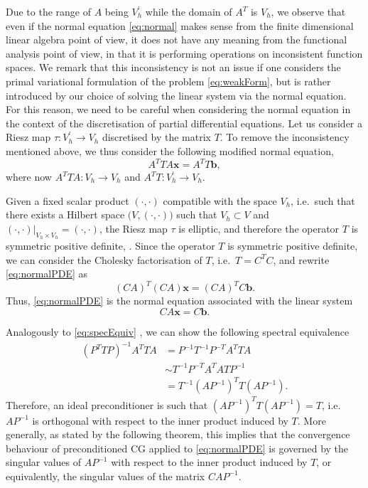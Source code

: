\documentclass[hidelinks,onefignum,onetabnum]{siamart220329}
\let\vec\mathbf
\begin{document}
Due to the range of $A$ being $V_h^\prime$ while the domain of $A^T$  is $V_h$, we observe that even if the normal equation \eqref{eq:normal} makes sense from the finite dimensional linear algebra point of view, it does not have any meaning from the functional analysis point of view, in that it is performing operations on inconsistent function spaces.
We remark that this inconsistency is not an issue if one considers the primal variational formulation of the problem \eqref{eq:weakForm}, but is rather introduced by our choice of solving the linear system via the normal equation.
For this reason, we need to be careful when considering the normal equation in the context of the discretisation of partial differential equations.
Let us consider a Riesz map $\tau:V_h^\prime\to V_h$ discretised by the matrix $T$.
To remove the inconsistency mentioned above, we thus consider the following modified normal equation,
\begin{equation}
    \label{eq:normalPDE}
    A^T TA\vec{x} = A^T T\vec{b},
\end{equation}
where now $A^TTA:V_h\to V_h$ and $A^T T: V_h^\prime \to V_h$.
\begin{remark}
    Given a fixed scalar product $(\cdot,\cdot)$ compatible with the space $V_h$, i.e.~such that there exists a Hilbert space $\big(V,(\cdot,\cdot))$ such that $V_h\subset V$ and $(\cdot,\cdot)|_{V_h\times V_h} = (\cdot,\cdot)$, the Riesz map $\tau$ is elliptic, and therefore the operator $T$ is symmetric positive definite, \cite{Kirby}.
    Since the operator $T$ is symmetric positive definite, we can consider the Cholesky factorisation of $T$, i.e.~$T = C^TC$, and rewrite \eqref{eq:normalPDE} as
    \begin{equation}
        \label{eq:normalPDECh}
        (CA)^T(CA)\vec{x} = (CA)^TC\vec{b}.
    \end{equation}
    Thus, \eqref{eq:normalPDE} is the normal equation associated with the linear system
    \begin{equation}
        \label{eq:linSysPDE}
        CA\vec{x}= C\vec{b}.
    \end{equation}
\end{remark}

Analogously to \eqref{eq:specEquiv} , we can show the following spectral equivalence
\begin{equation}
    \label{eq:specEquiv2}
    \begin{aligned}
        (P^TTP)^{-1}A^TTA & = P^{-1}T^{-1}P^{-T}A^TTA       \\
                          & \sim T^{-1}P^{-T}A^TATP^{-1}    \\
                          & =  T^{-1}(AP^{-1})^TT(AP^{-1}).
    \end{aligned}
\end{equation}
Therefore, an ideal preconditioner is such that $(AP^{-1})^TT(AP^{-1}) = T$, i.e. $AP^{-1}$ is orthogonal with respect to the inner product induced by $T$. More generally, as stated by the following theorem, this implies that the convergence behaviour of preconditioned CG applied to \eqref{eq:normalPDE} is governed by the singular values of $AP^{-1}$ with respect to the inner product induced by $T$, or equivalently, the singular values of the matrix $CAP^{-1}$.
\end{document}
